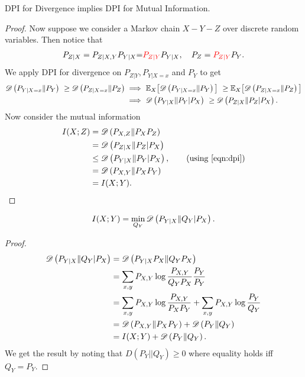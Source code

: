 \documentclass[11pt,a4paper]{article}
\begin{document}
\begin{theorem}
    DPI for Divergence implies DPI for Mutual Information.
\end{theorem}

\begin{proof}
    Now suppose we consider a Markov chain $X - Y - Z$ over discrete random variables. Then notice that 
    \begin{align*}
        P_{Z|X} = P_{Z|X,Y} P_{Y|X} {=} \textcolor{red}{P_{Z|Y}} P_{Y|X}, \quad P_Z = \textcolor{red}{P_{Z|Y}} P_Y.
    \end{align*}
    We apply DPI for divergence on $P_{Z|Y}, P_{Y|X=x}$ and $P_{Y}$ to get
    \begin{align}
        \mathscr{D} \left(P_{Y|X = x}\|P_{Y}\right)\ \ge \mathscr{D} \left(P_{Z|X = x}\|P_{Z}\right) \implies &\ \mathbb{E}_X \big[\mathscr{D} \left(P_{Y|X = x}\|P_{Y}\right)\big]\ \ge \mathbb{E}_X\big[\mathscr{D} \left(P_{Z|X = x}\| P_{Z}\right)\big] \nonumber \\
        \implies &\ \mathscr{D} \left(P_{Y|X}\|P_{Y} | P_X\right)\ \ge \mathscr{D} \left(P_{Z|X}\| P_{Z} | P_X\right).\label{eqn:dpi}
    \end{align}
    Now consider the mutual information
    \begin{align*}
        I(X;Z) &= \mathscr{D} \left(P_{X,Z}\|P_X P_Z\right) \\
        &= \mathscr{D} \left(P_{Z|X}\|P_Z | P_X\right) \\
        &\le \mathscr{D} \left(P_{Y|X}\|P_Y | P_X\right),\qquad \text{(using \eqref{eqn:dpi})} \\
        &= \mathscr{D} \left(P_{X,Y}\|P_X P_Y\right) \\
        &= I(X; Y).
    \end{align*}
\end{proof}

\begin{theorem}
    \begin{align*}
        I(X;Y) = \min_{Q_{Y}} \mathscr{D} \left(P_{Y|X}\|Q_{Y}|P_{X}\right).
    \end{align*}
\end{theorem}

\begin{proof}
    \begin{align*}
        \mathscr{D} \left(P_{Y|X}\|Q_{Y}|P_{X}\right) &= \mathscr{D} \left(P_{Y|X}P_{X}\|Q_{Y}P_{X}\right) \\ 
        &= \sum_{x,y} P_{X,Y} \log{\frac{P_{X,Y}}{Q_{Y}P_{X}} \frac{P_{Y}}{P_{Y}}} \\ 
        &= \sum_{x,y} P_{X,Y} \log{\frac{P_{X,Y}}{P_{X}P_{Y}} + \sum_{x,y} P_{X,Y} \log{\frac{P_{Y}}{Q_{Y}}}} \\ 
        &= \mathscr{D} \left(P_{X,Y}\|P_X P_Y\right) + \mathscr{D} \left(P_{Y}\|Q_Y\right) \\ 
        &= I(X;Y) + \mathscr{D} \left(P_{Y}\|Q_Y\right).
    \end{align*}
    We get the result by noting that $D(P_{Y}||Q_{Y}) \ge 0$ where equality holds iff $Q_{Y} = P_{Y}.$        
\end{proof}
\end{document}
